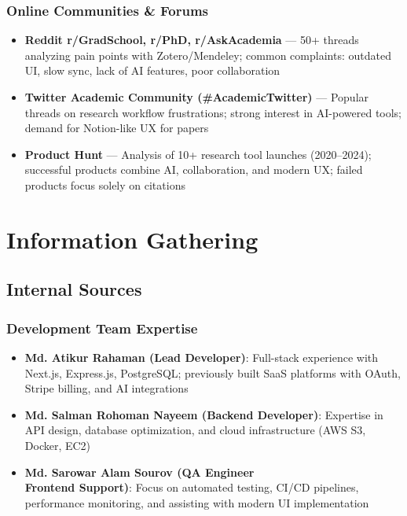\subsubsection{Online Communities \& Forums}

\begin{itemize}
    \item \textbf{Reddit r/GradSchool, r/PhD, r/AskAcademia} --- 50+ threads analyzing pain points with Zotero/Mendeley; common complaints: outdated UI, slow sync, lack of AI features, poor collaboration

    \item \textbf{Twitter Academic Community (\#AcademicTwitter)} --- Popular threads on research workflow frustrations; strong interest in AI-powered tools; demand for Notion-like UX for papers

    \item \textbf{Product Hunt} --- Analysis of 10+ research tool launches (2020--2024); successful products combine AI, collaboration, and modern UX; failed products focus solely on citations
\end{itemize}

\section{Information Gathering}

\subsection{Internal Sources}

\subsubsection{Development Team Expertise}

\begin{itemize}
    \item \textbf{Md. Atikur Rahaman (Lead Developer)}: Full-stack experience with Next.js, Express.js, PostgreSQL; previously built SaaS platforms with OAuth, Stripe billing, and AI integrations

    \item \textbf{Md. Salman Rohoman Nayeem (Backend Developer)}: Expertise in API design, database optimization, and cloud infrastructure (AWS S3, Docker, EC2)

    \item \textbf{Md. Sarowar Alam Sourov (QA Engineer \\ Frontend Support)}: Focus on automated testing, CI/CD pipelines, performance monitoring, and assisting with modern UI implementation
\end{itemize}


